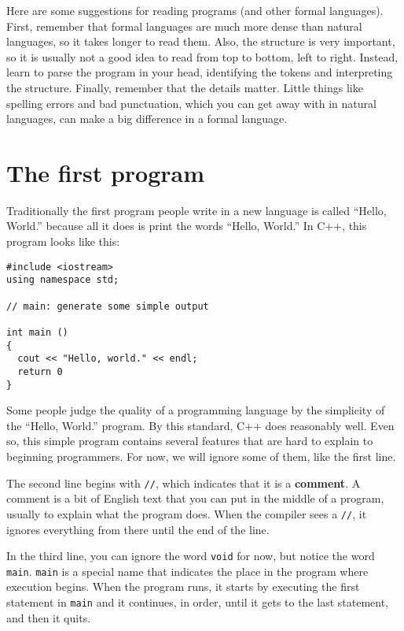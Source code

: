 Here are some suggestions for reading programs (and other formal
languages).  First, remember that formal languages are much more dense
than natural languages, so it takes longer to read them.  Also, the
structure is very important, so it is usually not a good idea to read
from top to bottom, left to right.  Instead, learn to parse the
program in your head, identifying the tokens and interpreting the
structure.  Finally, remember that the details matter.  Little things
like spelling errors and bad punctuation, which you can get away
with in natural languages, can make a big difference in a formal
language.

\section{The first program}
\label{hello}

Traditionally the first program people write in a new language
is called ``Hello, World.'' because all it does is print the
words ``Hello, World.''  In C++, this program looks like this:

\begin{verbatim}
#include <iostream>
using namespace std;

// main: generate some simple output

int main ()
{
  cout << "Hello, world." << endl;
  return 0
}
\end{verbatim}
%
Some people judge the quality of a programming language by
the simplicity of the ``Hello, World.'' program.  By this
standard, C++ does reasonably well.  Even so, this simple
program contains several features that are hard to explain to
beginning programmers.  For now, we will ignore some of
them, like the first line.


The second line begins with {\tt //}, which indicates
that it is a {\bf comment}.  A comment is a bit of
English text that you can put in the middle of a program,
usually to explain what the program does.  When the compiler
sees a {\tt //}, it ignores everything from there until the end
of the line.

In the third line, you can ignore the word {\tt void}
for now, but notice the word {\tt main}.  {\tt main} is a
special name that indicates the place in the program where execution
begins.  When the program runs, it starts by executing the first
statement in {\tt main} and it continues, in order, until it gets
to the last statement, and then it quits.

